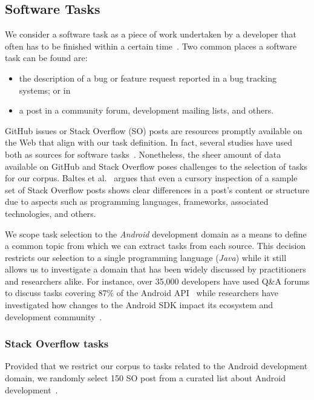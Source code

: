 \subsection{Software Tasks}
\label{cp4:corpus-tasks}


We consider a software task as a piece of work undertaken by a developer that often has to be finished within a certain time~\cite{2004merriam}.
Two common places a software task can be found are:

\begin{itemize}
    \item the description of a bug or feature request reported in a bug tracking systems; or in
    \item a post in a community forum, development mailing lists, and others.
\end{itemize}

GitHub issues or Stack Overflow (SO) posts are resources promptly available on the Web that align with our task definition.
In fact, several studies have used both as sources for software tasks~\cite{Arya2019, baltes2019, nadi2020, Xu2017}. Nonetheless, the sheer amount of data available on GitHub and Stack Overflow poses challenges to the selection of tasks for our corpus.
Baltes et al.~\cite{baltes2019} argues that even a cursory inspection of a sample set
of Stack Overflow posts shows clear differences in a post's content or structure due to aspects such as programming languages, frameworks, associated technologies, and others.


We scope task selection to
the \textit{Android} development domain as a means to define a common topic from which we can extract tasks from each source. This decision
restricts our selection to a single programming language (\textit{Java})
while it still allows us to investigate a domain that has been
widely discussed by practitioners and researchers alike.
For instance, over 35,000 developers have used Q\&A forums to discuss tasks covering 87\% of the Android API~\cite{parnin2012}
while researchers have investigated how changes to the Android SDK impact its ecosystem and development community~\cite{linares2014, bavota2014b, mcdonnell2013}.


\subsubsection{Stack Overflow tasks}

Provided that we restrict our corpus to tasks related to the Android development domain,
we randomly select 150 SO post from a curated list about Android development~\cite{baltes2019-rep}.


